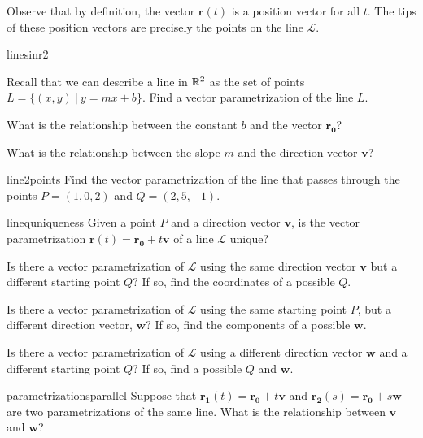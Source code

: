     Observe that by definition, the vector $\bm{r}(t)$ is a position vector for all $t$.  The tips of these position vectors are precisely the points on the line $\mathscr{L}$.

\begin{problem}{linesinr2}
    
    Recall that we can describe a line in $\mathbb{R}^2$ as the set of points $L = \{(x,y) \ | \ y = mx + b\}$.  Find a vector parametrization of the line $L$.
    
    \begin{subproblems}
    \item What is the relationship between the constant $b$ and the vector $\bm{r_0}$?
    \item What is the relationship between the slope $m$ and the direction vector $\bm{v}$?
    \end{subproblems}
    
\end{problem}

\begin{problem}{line2points}
    Find the vector parametrization of the line that passes through the points $P = (1,0,2)$ and $Q = (2,5,-1)$.
\end{problem}

\begin{problem}{linequniqueness}
    Given a point $P$ and a direction vector $\bm{v}$, is the vector parametrization $\bm{r}(t) = \bm{r_0} + t\bm{v}$ of a line $\mathscr{L}$ unique? 
    
    \begin{subproblems}
    \item Is there a vector parametrization of $\mathscr{L}$ using the same direction vector $\bm{v}$ but a different starting point $Q$?  If so, find the coordinates of a possible $Q$.
    \item Is there a vector parametrization of $\mathscr{L}$ using the same starting point $P$, but a different direction vector, $\bm{w}$?  If so, find the components of a possible $\bm{w}$.
    \item Is there a vector parametrization of $\mathscr{L}$ using a different direction vector $\bm{w}$ and a different starting point $Q$?  If so, find a possible $Q$ and $\bm{w}$.
    \end{subproblems}

    
\end{problem}

\begin{problem}{parametrizationsparallel}
    Suppose that $\bm{r_1}(t) = \bm{r_0} + t\bm{v}$ and $\bm{r_2}(s) = \bm{r_0} + s\bm{w}$ are two parametrizations of the same line.  What is the relationship between $\bm{v}$ and $\bm{w}$?
\end{problem}


